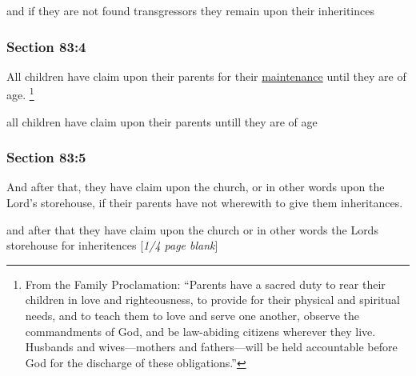 		\begin{framed}
		\scriptsize
			\begin{compactdesc}
				\item[JSP] and if they are not found transgressors they remain upon their inheritinces
			\end{compactdesc}
		\end{framed}

	\subsubsection{Section 83:4} %
		\label{DC83-4}

		All children have claim upon their parents for their \hyperref[MAINTENANCE]{maintenance} until they are of age.%
			\footnote{%
				From the Family Proclamation: ``Parents have a sacred duty to rear their children in love and righteousness, to provide for their physical and spiritual needs, and to teach them to love and serve one another, observe the commandments of God, and be law-abiding citizens wherever they live. Husbands and wives---mothers and fathers---will be held accountable before God for the discharge of these obligations.''
				}

		\begin{framed}
		\scriptsize
			\begin{compactdesc}
				\item[JSP] all children have claim upon their parents untill they are of age
			\end{compactdesc}
		\end{framed}

	\subsubsection{Section 83:5} %
		\label{DC83-5}

		And after that, they have claim upon the church, or in other words upon the Lord's storehouse, if their parents have not wherewith to give them inheritances.

		\begin{framed}
		\scriptsize
			\begin{compactdesc}
				\item[JSP] and after that they have claim upon the church or in other words the Lords storehouse for inheritences [\textit{1/4 page blank}]
			\end{compactdesc}
		\end{framed}

